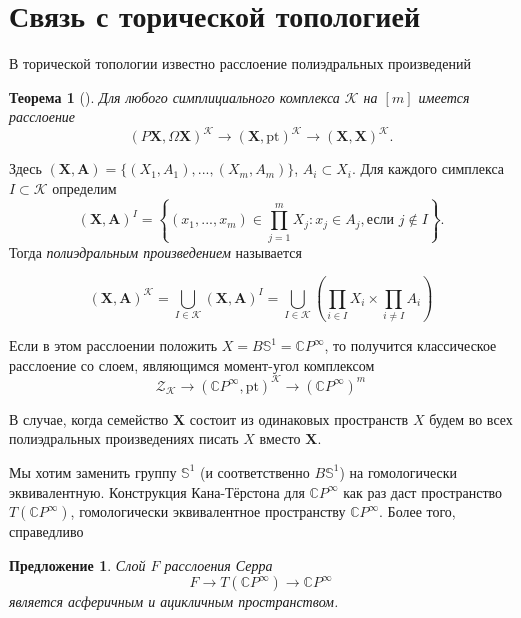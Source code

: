 \documentclass[14pt, dvipsnames]{extarticle}
\newtheorem{theorem}{Теорема}
\newtheorem{proposition}{Предложение}
\theoremstyle{definition}
\theoremstyle{remark}
\begin{document}
\iffalse

\section{Связь с торической топологией}


В торической топологии известно расслоение полиэдральных произведений



\begin{theorem}[\cite{Toric}]
Для любого симплициального комплекса $\mathcal{K}$ на $[m]$ имеется расслоение $$(P\bm{X}, \Omega\bm{X})^\mathcal{K}\to (\bm{X}, \mathrm{pt})^\mathcal{K}\to (\bm{X}, \bm{X})^\mathcal{K}.$$
\end{theorem}


Здесь $(\bm{X}, \bm{A})=\{ (X_1, A_1), ..., (X_m, A_m) \}$, $A_i\subset X_i$. Для каждого симплекса $I\subset \mathcal{K}$ определим $$(\bm{X}, \bm{A})^I=\left \{(x_1, ..., x_m)\in \prod\limits_{j=1}^m X_j: x_j\in A_j,\text{если $j\notin I$} \right \}.$$ Тогда {\it полиэдральным произведением} называется

$$(\bm{X}, \bm{A})^\mathcal{K}=\bigcup\limits_{I\in \mathcal{K}}(\bm{X}, \bm{A})^I=\bigcup\limits_{I\in \mathcal{K}}\left ( \prod\limits_{i\in I} X_i\times \prod\limits_{i\neq I} A_i   \right )$$

Если в этом расслоении положить $X=B \mathbb{S}^1=\mathbb{C}P^\infty$, то получится классическое расслоение со слоем, являющимся момент-угол комплексом $$\mathcal{Z}_{\mathcal{K}}\to (\mathbb{C}P^\infty, \mathrm{pt})^{\mathcal{K}}\to (\mathbb{C}P^\infty)^m$$

В случае, когда семейство $\bm{X}$ состоит из одинаковых пространств $X$ будем во всех полиэдральных произведениях писать $X$ вместо $\bm{X}$.




Мы хотим заменить группу $\mathbb{S}^1$ (и соответственно $B\mathbb{S}^1$) на гомологически эквивалентную. Конструкция Кана-Тёрстона для $\mathbb{C}P^\infty$ как раз даст пространство $T(\mathbb{C}P^\infty)$, гомологически эквивалентное пространству $\mathbb{C}P^\infty$. Более того, справедливо

\begin{proposition}
Слой $F$ расслоения Серра $$F\to T(\mathbb{C}P^\infty)\to \mathbb{C}P^\infty$$ является асферичным и ацикличным пространством.
\end{proposition}
\end{document}
